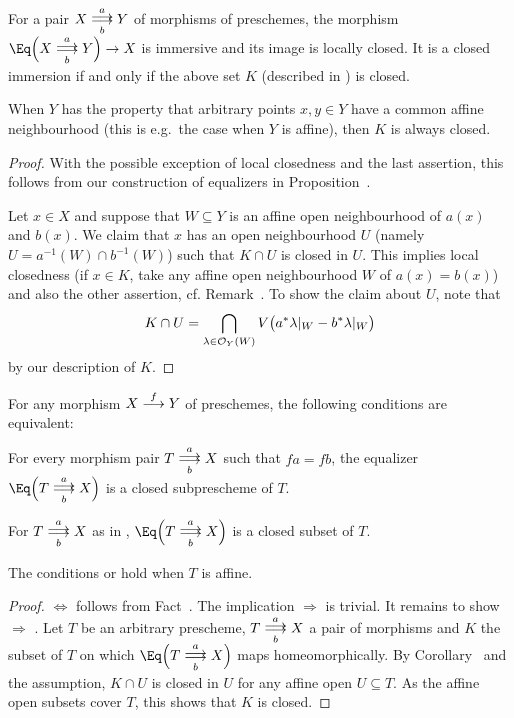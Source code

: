 \documentclass[a4paper,parskip=half,numbers=enddot, DIV=12]{scrreprt}
\begin{document}
\begin{fact}
	For a pair $X\doublemorphism[a][b]Y$ of morphisms of preschemes, the morphism $\Eq\Big(X\doublemorphism[a][b]Y\Big)\morphism X$ is immersive and its image is locally closed. It is a closed immersion if and only if the above set $K$ (described in ) is closed.
	
	When $Y$ has the property that arbitrary points $x,y\in Y$ have a common affine neighbourhood (this is e.g.\ the case when $Y$ is affine), then $K$ is always closed.
\end{fact}
\begin{proof}
	With the possible exception of local closedness and the last assertion, this follows from our construction of equalizers in Proposition~. 
	
	Let $x\in X$ and suppose that $W\subseteq Y$ is an affine open neighbourhood of $a(x)$ and $b(x)$. We claim that $x$ has an open neighbourhood $U$ (namely $U=a^{-1}(W)\cap b^{-1}(W)$) such that $K\cap U$ is closed in $U$. This implies local closedness (if $x\in K$, take any affine open neighbourhood $W$ of $a(x)=b(x)$) and also the other assertion, cf. Remark~. To show the claim about $U$, note that
	\begin{align*}
		K\cap U=\bigcap_{\lambda\in\mathcal{O}_Y(W)}V\big(a^*\lambda|_W-b^*\lambda|_W\big)
	\end{align*}
	by our description of $K$.
\end{proof}
\begin{fact}
	For any morphism $X\morphism[f]Y$ of preschemes, the following conditions are equivalent:
	\begin{alphanumerate}
		\item For every morphism pair $T\doublemorphism[a][b] X$ such that $fa=fb$, the equalizer $\Eq\Big(T\doublemorphism[a][b]X\Big)$ is a closed subprescheme of $T$.
		\item For $T\doublemorphism[a][b] X$ as in , $\Eq\Big(T\doublemorphism[a][b]X\Big)$ is a closed subset of $T$.
		\item The conditions  or  hold when $T$ is affine.
	\end{alphanumerate}
\end{fact}
\begin{proof}
	 $\Leftrightarrow$  follows from Fact~. The implication  $\Rightarrow$  is trivial. It remains to show  $\Rightarrow$ . Let $T$ be an arbitrary prescheme, $T\doublemorphism[a][b]X$ a pair of morphisms and $K$ the subset of $T$ on which $\smash{\Eq\Big(}T\doublemorphism[\smash{a}][b]X\smash{\Big)}$ maps homeomorphically. By Corollary~ and the assumption, $K\cap U$ is closed in $U$ for any affine open $U\subseteq T$. As the affine open subsets cover $T$, this shows that $K$ is closed.
\end{proof}
\end{document}
